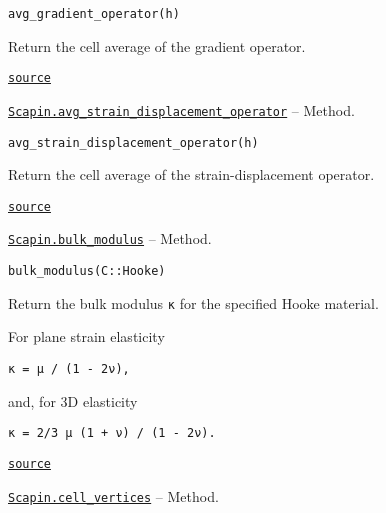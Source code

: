 \documentclass[oneside]{memoir}
\begin{document}
\begin{adjustwidth}{2em}{0pt}


\begin{verbatim}
avg_gradient_operator(h)
\end{verbatim}

Return the cell average of the gradient operator.



\href{https://github.com/sbrisard/Scapin.jl/blob/ea3f90c60e90cdf214e41b1314a8ee608e0b8d10/src/bri17.jl#L191-L195}{\texttt{source}}


\end{adjustwidth}
\hypertarget{10684753069292900654}{} 
\hyperlink{10684753069292900654}{\texttt{Scapin.avg\_strain\_displacement\_operator}}  -- {Method.}

\begin{adjustwidth}{2em}{0pt}


\begin{verbatim}
avg_strain_displacement_operator(h)
\end{verbatim}

Return the cell average of the strain-displacement operator.



\href{https://github.com/sbrisard/Scapin.jl/blob/ea3f90c60e90cdf214e41b1314a8ee608e0b8d10/src/bri17.jl#L235-L239}{\texttt{source}}


\end{adjustwidth}
\hypertarget{1262405759471151845}{} 
\hyperlink{1262405759471151845}{\texttt{Scapin.bulk\_modulus}}  -- {Method.}

\begin{adjustwidth}{2em}{0pt}


\begin{verbatim}
bulk_modulus(C::Hooke)
\end{verbatim}

Return the bulk modulus \texttt{κ} for the specified Hooke material.

For plane strain elasticity


\begin{lstlisting}
κ = μ / (1 - 2ν),
\end{lstlisting}

and, for 3D elasticity


\begin{lstlisting}
κ = 2/3 μ (1 + ν) / (1 - 2ν).
\end{lstlisting}



\href{https://github.com/sbrisard/Scapin.jl/blob/ea3f90c60e90cdf214e41b1314a8ee608e0b8d10/src/hooke.jl#L51-L67}{\texttt{source}}


\end{adjustwidth}
\hypertarget{7598511707942506255}{} 
\hyperlink{7598511707942506255}{\texttt{Scapin.cell\_vertices}}  -- {Method.}
\end{document}
